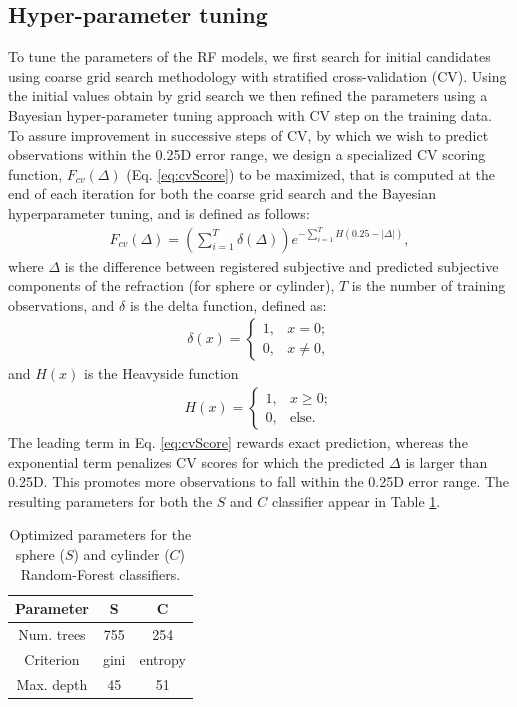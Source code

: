 \documentclass[article,twocolumn,preprint,10pt]{paper}%
\renewcommand{\(}{\left(}
\renewcommand{\)}{\right)}
\renewcommand{\[}{\left[}
\renewcommand{\]}{\right]}
\newcommand{\ds}{\displaystyle}
\newcommand{\beq}{\begin{eqnarray}}
\newcommand{\eeq}{\end{eqnarray}}
\newcommand{\beqq}{\begin{eqnarray*}}
\newcommand{\eeqq}{\end{eqnarray*}}
\newcommand{\1}{\mbox{\boldmath$1$}}
\begin{document}
	\subsection{Hyper-parameter tuning }\label{subsection:hyperparameterTunning}
	To tune the parameters of the RF models, we first search for initial candidates using coarse grid search methodology with stratified cross-validation (CV). Using the initial values obtain by grid search we then refined the parameters using a Bayesian hyper-parameter tuning approach with CV step on the training data. To assure improvement in successive steps of CV, by which we wish to predict observations within the 0.25D error range, we design a specialized CV scoring function, $F_{cv}(\Delta)$ (Eq. \ref{eq:cvScore}) to be maximized, that is computed at the end of each iteration for both the coarse grid search and the Bayesian hyperparameter tuning, and is defined as follows:
	\beq\label{eq:cvScore}
	F_{cv}(\Delta) = \left(\sum_{i=1}^T\delta(\Delta )\right)e^{-\ds\sum_{i=1}^T H(0.25-|\Delta|)},
	\eeq 
	where $\Delta $ is the difference between registered subjective and predicted subjective  components of the refraction (for sphere or cylinder), $T$ is the number of training observations,  and $\delta$ is the delta function, defined as:
	\beqq
	\delta(x) = \begin{cases}
		1, & x=0;\\
		0,& x\neq 0,
	\end{cases}
	\eeqq 
	and $H(x)$ is the Heavyside function 
	\beqq
	H(x) = \begin{cases}
		1,& x\geq0;\\
		0,& \text{else}.
	\end{cases}
	\eeqq 
	The leading term in Eq. \ref{eq:cvScore} rewards exact prediction, whereas the exponential term penalizes CV scores for which the predicted $\Delta$ is larger than 0.25D. This promotes more observations to fall within the 0.25D error range. 
	The resulting parameters for both the $S$ and $C$ classifier appear in Table \ref{table:hyperparameters}.
	\begin{table}
		\begin{tabular}{c|c|c}
			Parameter & S & C\\
			\hline 
			Num. trees &755 & 254\\
			Criterion & gini& entropy\\
			Max. depth &45 & 51		
		\end{tabular}
		\caption{Optimized parameters for the sphere ($S$) and cylinder ($C$) Random-Forest classifiers.}
		\label{table:hyperparameters}
	\end{table}
\end{document}
